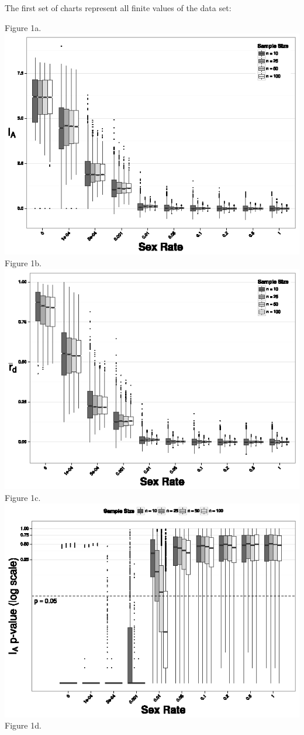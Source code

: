 \documentclass[letterpaper, 10pt]{article}
\begin{document}
The first set of charts represent all finite values of the data set:

\begin{center}
Figure 1a.\\
\includegraphics{figures/Ia_chart.eps}\\Figure 1b.\\
\includegraphics{figures/rbarD_chart.eps}\\Figure 1c.\\
\includegraphics{figures/Ia_pval.eps}\\Figure 1d.\\

\end{center}
\end{document}
